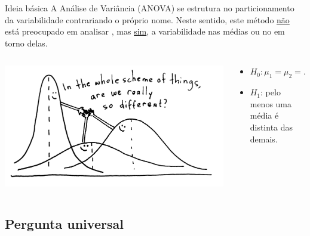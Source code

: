 \documentclass{bredelebeamer}
\begin{document}
\begin{frame}
\begin{exampleblock}{Ideia básica}
A Análise de Variância (ANOVA) se estrutura no particionamento da
variabilidade contrariando o próprio nome. Neste sentido, este método
\underline{não} está preocupado em analisar , mas
\underline{sim}, a variabilidade nas médias ou no em torno delas. 
\end{exampleblock}

\begin{columns}
\begin{column}{0.5\textwidth}
\begin{center}
\includegraphics[scale=0.08]{images/anova.jpg}
\end{center}
\end{column}

\begin{column}{0.5\textwidth}
\begin{itemize}
\item $H_{0}: \mu_{1} = \mu_{2} = ...  = \mu_{k}$ \\
\item $H_{1}$\small{: pelo menos uma média é distinta das demais.}
\end{itemize}
\end{column}
\end{columns}
\end{frame}

\subsection{Pergunta universal}
\end{document}
